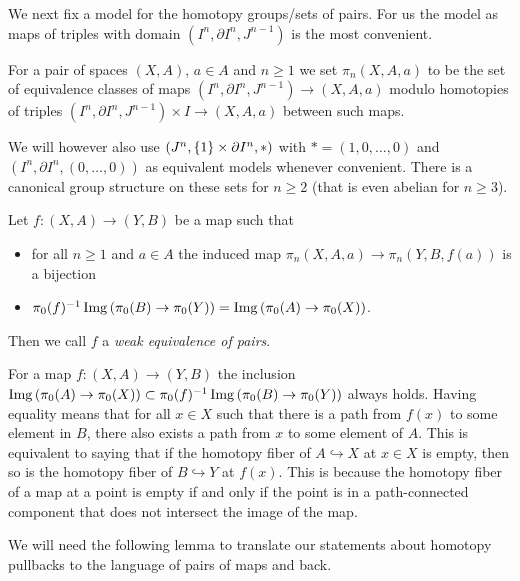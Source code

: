 We next fix a model for the homotopy groups/sets of pairs.
For us the model as maps of triples with domain $(I^n,\partial I^n,J^{n-1})$ is the most convenient.
\begin{definition}
    For a pair of spaces $(X,A)$, $a\in A$ and $n\geq 1$ we set $\pi_n(X,A,a)$ to be the set of equivalence classes of maps $(I^n,\partial I^n,J^{n-1})\to(X,A,a)$ modulo homotopies of triples $(I^n,\partial I^n,J^{n-1})\times I\to(X,A,a)$ between such maps.
\end{definition}
We will however also use $(J^n,\left\lbrace1\right\rbrace\times\partial I^n,*)$ with $*=(1,0,\ldots,0)$ and $(I^n,\partial I^n,(0,\ldots,0))$ as equivalent models whenever convenient.
There is a canonical group structure on these sets for $n\geq 2$ (that is even abelian for $n\geq 3$).
\begin{definition}\label{def:weOfPairs}
    Let $f\colon(X,A)\to (Y,B)$ be a map such that 
    \begin{itemize}
        \item for all $n\geq 1$ and $a\in A$ the induced map $\pi_n(X,A,a)\to\pi_n(Y,B,f(a))$ is a bijection
        \item $\pi_0(f)^{-1}\operatorname{Img}\left(\pi_0(B)\to\pi_0(Y)\right)=\operatorname{Img}\left(\pi_0(A)\to\pi_0(X)\right)$.
    \end{itemize}
    Then we call $f$ a \emph{weak equivalence of pairs}.
\end{definition}
\begin{remark}\label{rmk:emptyFiber}
    For a map $f\colon(X,A)\to (Y,B)$ the inclusion $\operatorname{Img}\left(\pi_0(A)\to\pi_0(X)\right)\subset\pi_0(f)^{-1}\operatorname{Img}\left(\pi_0(B)\to\pi_0(Y)\right)$ always holds.
    Having equality means that for all $x\in X$ such that there is a path from $f(x)$ to some element in $B$, there also exists a path from $x$ to some element of $A$.
    This is equivalent to saying that if the homotopy fiber of $A\hookrightarrow X$ at $x\in X$ is empty, then so is the homotopy fiber of $B\hookrightarrow Y$ at $f(x)$.
    This is because the homotopy fiber of a map at a point is empty if and only if the point is in a path-connected component that does not intersect the image of the map.
\end{remark}
We will need the following lemma to translate our statements about homotopy pullbacks to the language of pairs of maps and back.
